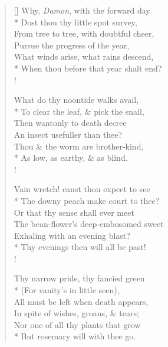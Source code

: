\documentclass[MAIN]{subfiles}
\begin{document}
\begin{verse}[\versewidth]
Why, \emph{Damon}, with the forward day\\*
Dost thou thy little spot survey,\\
From tree to tree, with doubtful cheer,\\
Pursue the progress of the year,\\
What winds arise, what rains descend,\\*
When thou before that year shalt end?\\!

What do thy noontide walks avail,\\*
To clear the leaf, \& pick the snail,\\
Then wantonly to death decree\\
An insect usefuller than thee?\\
Thou \& the worm are brother-kind,\\*
As low, as earthy, \& as blind.\\!

Vain wretch! canst thou expect to see\\*
The downy peach make court to thee?\\
Or that thy sense shall ever meet\\
The bean-flower's deep-embosomed sweet\\
Exhaling with an evening blast?\\*
Thy evenings then will all be past!\\!

Thy narrow pride, thy fancied green\\*
(For vanity's in little seen),\\
All must be left when death appears,\\
In spite of wishes, groans, \& tears;\\
Nor one of all thy plants that grow\\*
But rosemary will with thee go.
\end{verse}
\end{document}
